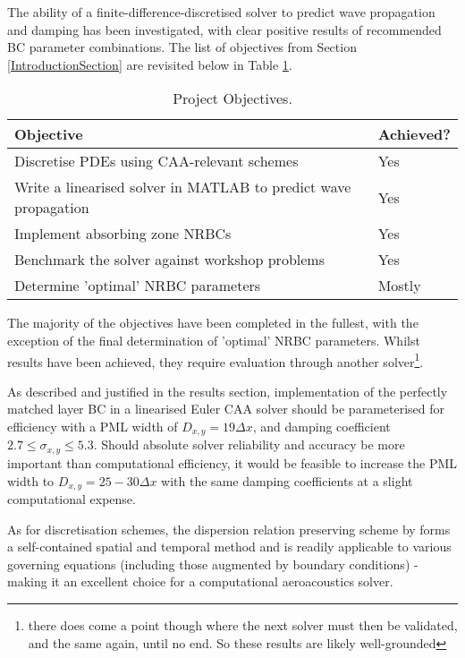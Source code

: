 The ability of a finite-difference-discretised solver to predict wave propagation and damping has been investigated, with clear positive results of recommended BC parameter combinations. The list of objectives from Section \ref{IntroductionSection} are revisited below in Table \ref{tab:ConclusionObjectives}.

\begin{table}[h]
    \centering
    \caption{Project Objectives.}
    \begin{tabular}{ll}
        \hline \hline
        \textbf{Objective} & \textbf{Achieved?} \\
        \hline
        Discretise PDEs using CAA-relevant schemes & Yes \\
        Write a linearised solver in MATLAB to predict wave propagation & Yes \\
        Implement absorbing zone NRBCs & Yes\\
        Benchmark the solver against workshop problems & Yes\\
        Determine 'optimal' NRBC parameters & Mostly \\
        \hline \hline
    \end{tabular}
    \label{tab:ConclusionObjectives}
\end{table}


The majority of the objectives have been completed in the fullest, with the exception of the final determination of 'optimal' NRBC parameters. Whilst results have been achieved, they require evaluation through another solver\footnote[2]{there does come a point though where the next solver must then be validated, and the same again, until no end. So these results are likely well-grounded}.

As described and justified in the results section, implementation of the perfectly matched layer BC in a linearised Euler CAA solver should be parameterised for efficiency with a PML width of $D_{x,y}=19 \Delta x$, and damping coefficient $2.7 \leq \sigma_{x,y} \leq 5.3$. Should absolute solver reliability and accuracy be more important than computational efficiency, it would be feasible to increase the PML width to $D_{x,y}=25-30 \Delta x$ with the same damping coefficients at a slight computational expense.


As for discretisation schemes, the dispersion relation preserving scheme by \textcite{tam193DRP} forms a self-contained spatial and temporal method and is readily applicable to various governing equations (including those augmented by boundary conditions) - making it an excellent choice for a computational aeroacoustics solver. 



